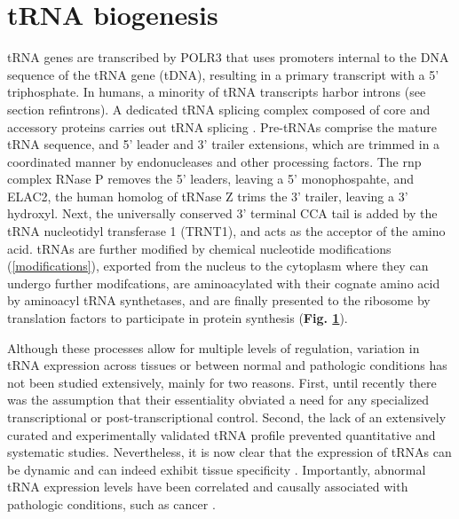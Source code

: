 \documentclass[12pt]{rockefeller}
\begin{document}
\section{tRNA biogenesis}\label{biogenesis}
tRNA genes are transcribed by POLR3 that uses promoters internal to the DNA sequence of the tRNA gene (tDNA), resulting in a primary transcript with a 5' triphosphate. In humans, a minority of tRNA transcripts harbor introns (see section ref{introns}). A dedicated tRNA splicing complex composed of core and accessory proteins carries out tRNA splicing \cite{trotta1999trna,Paushkin:2004wl,Weitzer:2007hda, Popow:2011ffa,Popow:2014ita}. Pre-tRNAs comprise the mature tRNA sequence, and 5' leader and 3' trailer extensions, which are trimmed in a coordinated manner by endonucleases and other processing factors. The \gls{rnp} complex RNase P removes the 5' leaders, leaving a 5' monophospahte, and ELAC2, the human homolog of tRNase Z trims the 3' trailer, leaving a 3' \gls{hydroxyl}. Next, the universally conserved 3' terminal CCA tail is added by the tRNA nucleotidyl transferase 1 (TRNT1), and acts as the acceptor of the amino acid. tRNAs are further modified by chemical nucleotide modifications (\ref{modifications}), exported from the nucleus to the cytoplasm where they can undergo further modifcations, are aminoacylated with their cognate amino acid by aminoacyl tRNA synthetases, and are finally presented to the ribosome by translation factors to participate in protein synthesis (\textbf{Fig. \ref{biogenesis}})\cite{Phizicky:2010jf,Hopper:2010ho,Hopper:2013dl}.

Although these processes allow for multiple levels of regulation, variation in tRNA expression across tissues or between normal and pathologic conditions has not been studied extensively, mainly for two reasons. First, until recently there was the assumption that their essentiality obviated a need for any specialized transcriptional or post-transcriptional control. Second, the lack of an extensively curated and experimentally validated tRNA profile prevented quantitative and systematic studies. Nevertheless, it is now clear that the expression of tRNAs can be dynamic and can indeed exhibit tissue specificity \cite{Dittmar:2006du,Gingold:2014iz}. Importantly, abnormal tRNA expression levels have been correlated and causally associated with pathologic conditions, such as cancer \cite{Gingold:2014iz,Goodarzi:2016gd}.
\newpage
\end{document}
